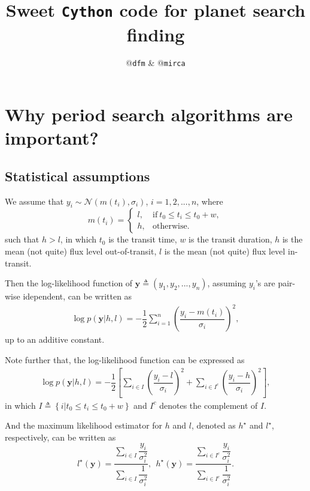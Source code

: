 \documentclass{article}
\title{Sweet \texttt{Cython} code for planet search finding}
\author{@\texttt{dfm} \& @\texttt{mirca}}
\begin{document}
\maketitle
\section{Why period search algorithms are important?}
\subsection{Statistical assumptions}
We assume that $y_i \sim \mathcal{N}(m(t_i), \sigma_i)$, $i=1, 2, ..., n$, where
\begin{equation}
m(t_i) =
\left\{
    \begin{array}{ll}
        l, & \text{if}~t_0 \leq t_i \leq t_0 + w ,\\
        h, & \text{otherwise}.
    \end{array}
\right.
\end{equation}
such that $h>l$, in which $t_0$ is the transit time, $w$ is the transit duration,
$h$ is the mean (not quite) flux level out-of-transit, $l$ is the mean (not quite)
flux level in-transit.

Then the log-likelihood function of $\bm{y} \triangleq (y_1, y_2, ..., y_n)$,
assuming $y_i$'s are pair-wise idependent, can be written as
\begin{align}
    \log p(\bm{y}| h, l) = -\dfrac{1}{2}\sum_{i=1}^{n}\left(\dfrac{y_i - m(t_i)}{\sigma_i}\right)^2,
\end{align}
up to an additive constant.

Note further that, the log-likelihood function can be expressed as
\begin{align}
    \log p(\bm{y}| h, l) = -\dfrac{1}{2}\left[\sum_{i \in I}\left(\dfrac{y_i - l}{\sigma_i}\right)^2
                              + \sum_{i \in I^{c}}\left(\dfrac{y_i - h}{\sigma_i}\right)^2\right],
\end{align}
in which $I\triangleq\left\{i | t_0 \leq t_i \leq t_0 + w \right\}$ and $I^{c}$ denotes the complement of $I$.

And the maximum likelihood estimator for $h$ and $l$, denoted as $h^{\star}$ and $l^{\star}$,
respectively, can be written as
\begin{equation}
    l^{\star}(\bm{y}) = \dfrac{\displaystyle\sum_{i \in I}\dfrac{y_i}{\sigma^2_i}}{\displaystyle\sum_{i\in I}\dfrac{1}{\sigma^2_i}},
    ~~h^{\star}(\bm{y}) = \dfrac{\displaystyle\sum_{i \in I^{c}}\dfrac{y_i}{\sigma^2_i}}{\displaystyle\sum_{i\in I^{c}}\dfrac{1}{\sigma^2_i}}.
\end{equation}
\end{document}
